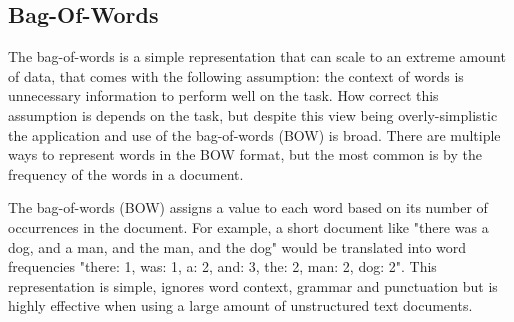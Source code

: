 

\subsection{Bag-Of-Words}\label{bg:BOW}
The bag-of-words is a  simple representation that can scale to an extreme amount of data, that comes with the following assumption: the context of words is unnecessary information to perform well on the task. How correct this assumption is depends on the task, but despite this view being overly-simplistic the application and use of the bag-of-words (BOW) is broad. There are multiple ways to represent words in the BOW format, but the most common is by the frequency of the words in a document.


The bag-of-words (BOW)  assigns a value to each word based on its number of occurrences in the document. For example, a short document like "there was a dog, and a man, and the man, and the dog" would be translated into word frequencies "there: 1, was: 1, a: 2, and: 3, the: 2, man: 2, dog: 2". This representation is simple,  ignores word context, grammar and punctuation but is highly effective when using a large amount of unstructured text documents.  %

